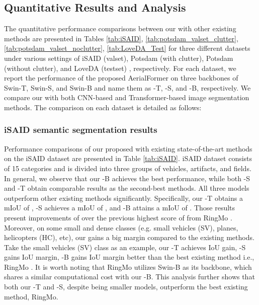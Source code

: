 \documentclass[journal]{IEEEtran}
\begin{document}
\subsection{Quantitative Results and Analysis}
The quantitative performance comparisons between our \model with other existing methods are presented in Tables \ref{tab:iSAID}, \ref{tab:potsdam_valset_clutter}, \ref{tab:potsdam_valset_noclutter}, \ref{tab:LoveDA_Test}
for three different datasets under various settings of iSAID (valset), Potsdam (with clutter), Potsdam (without clutter), and LoveDA (testset)
, respectively. For each dataset, we report the performance of the proposed AerialFormer on three backbones of Swin-T, Swin-S, and Swin-B and name them as \model-T, \model-S, and \model-B, respectively. We compare our \model with both CNN-based and Transformer-based image segmentation methods. The comparison on each dataset is detailed as follows:

\subsubsection{\textbf{iSAID semantic segmentation results}}
\label{sec:iSAID_results}
Performance comparisons of our proposed \model with existing state-of-the-art methods on the iSAID dataset are presented in Table \ref{tab:iSAID}. iSAID dataset consists of 15 categories and is divided into three groups of vehicles, artifacts, and fields. In general, we observe that our \model-B achieves the best performance, while both \model-S and \model-T obtain comparable results as the second-best methods. All three models outperform other existing methods significantly. Specifically, our \model-T obtains a mIoU of  , \model-S achieves a mIoU of  , and \model-B attains a mIoU of . Those results present improvements of   over the previous highest score of  from RingMo \cite{sun2022ringmo}. Moreover, on some small and dense classes (e.g. small vehicles (SV), planes, helicopters (HC), etc), our \model gains a big margin compared to the existing methods. Take the small vehicles (SV) class as an example, our \model-T achieves  IoU gain, \model-S gains  IoU margin, \model-B gains  IoU margin better than the best existing method i.e., RingMo \cite{sun2022ringmo}. It is worth noting that RingMo utilizes Swin-B as its backbone, which shares a similar computational cost with our \model-B. This analysis further shows that both our \model-T and \model-S, despite being smaller models, outperform the best existing method, RingMo.
\end{document}
